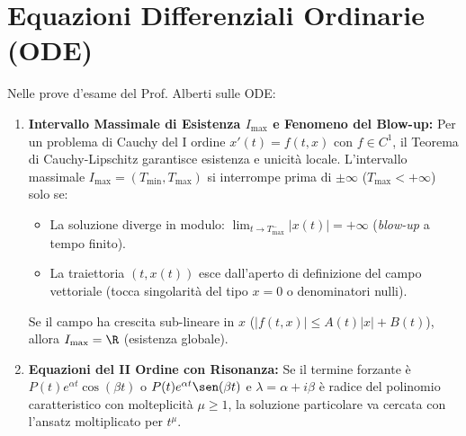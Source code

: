 \section{Equazioni Differenziali Ordinarie (ODE)}
\label{sec:esami_ode}

\begin{esame}
Nelle prove d'esame del Prof. Alberti sulle ODE:
\begin{enumerate}
    \item \textbf{Intervallo Massimale di Esistenza $I_{\max}$ e Fenomeno del Blow-up:}
    Per un problema di Cauchy del I ordine $x'(t) = f(t, x)$ con $f \in C^1$, il Teorema di Cauchy-Lipschitz garantisce esistenza e unicità locale. L'intervallo massimale $I_{\max} = (T_{\min}, T_{\max})$ si interrompe prima di $\pm\infty$ ($T_{\max} < +\infty$) solo se:
    \begin{itemize}
        \item La soluzione diverge in modulo: $\lim_{t \to T_{\max}^-} |x(t)| = +\infty$ (\emph{blow-up} a tempo finito).
        \item La traiettoria $(t, x(t))$ esce dall'aperto di definizione del campo vettoriale (tocca singolarità del tipo $x = 0$ o denominatori nulli).
    \end{itemize}
    Se il campo ha crescita sub-lineare in $x$ ($|f(t, x)| \le A(t)|x| + B(t)$), allora $I_{\max} = \R$ (esistenza globale).
    \item \textbf{Equazioni del II Ordine con Risonanza:}
    Se il termine forzante è $P(t)e^{\alpha t}\cos(\beta t)$ o $P(t)e^{\alpha t}\sen(\beta t)$ e $\lambda = \alpha + i\beta$ è radice del polinomio caratteristico con molteplicità $\mu \ge 1$, la soluzione particolare va cercata con l'ansatz moltiplicato per $t^\mu$.
\end{enumerate}
\end{esame}


